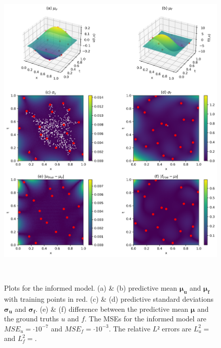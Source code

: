 \documentclass{article}
\begin{document}
\begin{figure}[htbp!]
    \centering
    \includegraphics[width=1\textwidth]{../final_examples/poisson/merged_2d_plots.png}
    \caption{Plots for the informed model. (a) \& (b)  predictive mean $\bm{\mu_u}$ and $\bm{\mu_f}$ with training points in red. (c) \& (d) predictive standard deviations $\bm{\sigma_u}$ and $\bm{\sigma_f}$. (e) \& (f) difference between the predictive mean $\bm{\mu}$ and the ground truths $u$ and $f$. The MSEs for the informed model are $MSE_u =  \cdot 10^{-7}$ and $MSE_f =  \cdot 10^{-3}$. The relative $L²$ errors are $L^2_u = $ and $L^2_f = $.}
    ~\label{fig:poisson}
\end{figure}
\end{document}
